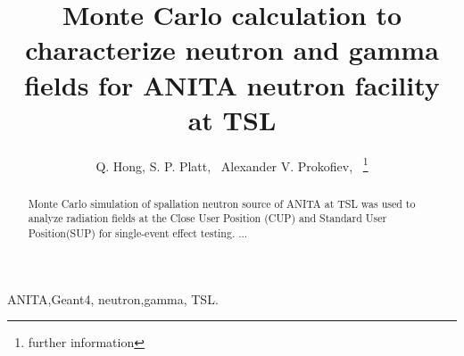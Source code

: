 \documentclass[12pt,journal]{IEEEtran}
\begin{document}
\title{Monte Carlo calculation to characterize neutron and gamma fields for ANITA neutron facility at TSL}

\author{Q. Hong,
S. P. Platt,~
Alexander V. Prokofiev,~
\thanks{further information}\\[2mm] 	%
\vspace{-5mm}
}



\maketitle %


\begin{abstract}
Monte Carlo simulation of spallation neutron source of ANITA at TSL was used to analyze radiation fields at the Close User Position (CUP) and Standard User Position(SUP) for single-event effect testing. ...
\end{abstract}

\begin{IEEEkeywords}
ANITA,Geant4, neutron,gamma, TSL.
\end{IEEEkeywords}


\IEEEpeerreviewmaketitle
\end{document}
